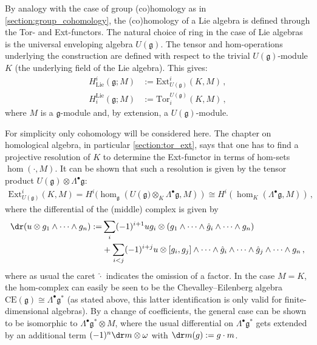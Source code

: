     By analogy with the case of group (co)homology as in \cref{section:group_cohomology}, the (co)homology of a Lie algebra is defined through the Tor- and Ext-functors. The natural choice of ring in the case of Lie algebras is the universal enveloping algebra $U(\mathfrak{g})$. The tensor and hom-operations underlying the construction are defined with respect to the trivial $U(\mathfrak{g})$-module $K$ (the underlying field of the Lie algebra). This gives:
    \begin{align}
        H^i_{\text{Lie}}(\mathfrak{g};M) &:= \mathrm{Ext}^i_{U(\mathfrak{g})}(K,M)\,,\\
        H_i^{\text{Lie}}(\mathfrak{g};M) &:= \mathrm{Tor}_i^{U(\mathfrak{g})}(K,M)\,,
    \end{align}
    where $M$ is a $\mathfrak{g}$-module and, by extension, a $U(\mathfrak{g})$-module.

    For simplicity only cohomology will be considered here. The chapter on homological algebra, in particular \cref{section:tor_ext}, says that one has to find a projective resolution of $K$ to determine the Ext-functor in terms of hom-sets $\hom(\cdot, M)$. It can be shown that such a resolution is given by the tensor product $U(\mathfrak{g})\otimes\Lambda^\bullet\mathfrak{g}$:
    \begin{gather}
        \mathrm{Ext}^i_{U(\mathfrak{g})}(K,M) = H^i(\hom_{\mathfrak{g}}(U(\mathfrak{g)}\otimes_K\Lambda^\bullet\mathfrak{g},M))\cong H^i(\hom_K(\Lambda^\bullet\mathfrak{g},M))\,,
    \end{gather}
    where the differential of the (middle) complex is given by
    \begin{align}
        \dr(u\otimes g_1\wedge\cdots\wedge g_n) := &\sum_i(-1)^{i+1}ug_i\otimes(g_1\wedge\cdots\wedge\hat{g}_i\wedge\cdots\wedge g_n)\\
        &+\sum_{i<j}(-1)^{i+j}u\otimes[g_i,g_j]\wedge\cdots\wedge\hat{g}_i\wedge\cdots\wedge\hat{g}_j\wedge\cdots\wedge g_n\,,\nonumber
    \end{align}
    where as usual the caret $\hat\cdot$ indicates the omission of a factor. In the case $M=K$, the hom-complex can easily be seen to be the Chevalley--Eilenberg algebra $\mathrm{CE}(\mathfrak{g})\cong\Lambda^\bullet\mathfrak{g}^*$ (as stated above, this latter identification is only valid for finite-dimensional algebras). By a change of coefficients, the general case can be shown to be isomorphic to $\Lambda^\bullet\mathfrak{g}^*\otimes M$, where the usual differential on $\Lambda^\bullet\mathfrak{g}^*$ gets extended by an additional term $(-1)^n\dr m\otimes\omega$ with $\dr m(g):=g\cdot m$.

